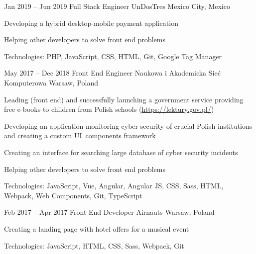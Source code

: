 \begin{sectionlist}
    \sectionlistitemjob
        {Jan 2019 -- Jun 2019}
        {Full Stack Engineer}
        {UnDosTres}
        {Mexico City, Mexico}
        {
            \begin{joblisting}
                \item Developing a hybrid desktop-mobile payment application
                \item Helping other developers to solve front end problems
                \item Technologies: PHP, JavaScript, CSS, HTML, Git, Google
                    Tag Manager
            \end{joblisting}
        }

    \sectionlistitemjob
        {May 2017 -- Dec 2018}
        {Front End Engineer}
        {Naukowa i Akademicka Sie\'{c} Kom\-pu\-te\-ro\-wa \hfill \linebreak}
        {Warsaw, Poland}
        {
            \begin{joblisting}
                \item Leading (front end) and successfully launching a government
                    service providing free e-books to children from Polish schools
                    (\url{https://lektury.gov.pl/})
                \item Developing an application monitoring cyber security of crucial
                    Polish institutions and creating a custom UI~components
                    framework
                \item Creating an interface for searching large database of cyber
                    security incidents
                \item Helping other developers to solve front end problems
                \item Technologies: JavaScript, Vue, Angular, Angular JS,
                    CSS, Sass, HTML, Webpack, Web Components, Git,
                    TypeScript
            \end{joblisting}
        }

    \sectionlistitemjob
        {Feb 2017 -- Apr 2017}
        {Front End Developer}
        {Airnauts}
        {Warsaw, Poland}
        {
            \begin{joblisting}
                \item Creating a landing page with hotel offers for a musical
                    event
                \item Technologies: JavaScript, HTML, CSS, Sass, Webpack,
                    Git
            \end{joblisting}
        }


\end{sectionlist}
